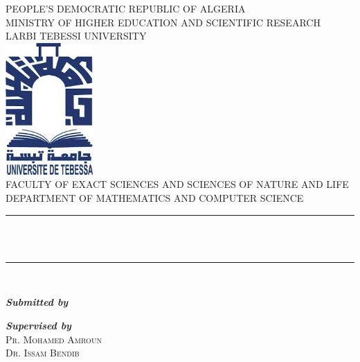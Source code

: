 \begin{titlepage}
	\begin{center}
		PEOPLE’S DEMOCRATIC REPUBLIC OF ALGERIA\\[0.4cm]
		MINISTRY OF HIGHER EDUCATION AND SCIENTIFIC RESEARCH\\[0.4cm]
		LARBI TEBESSI UNIVERSITY\\[0.4cm]
		\includegraphics[width=0.25\textwidth]{./images/univ-tebessa.jpg}\\[1cm]
		FACULTY OF EXACT SCIENCES AND SCIENCES OF NATURE AND LIFE\\[0.4cm]
		DEPARTMENT OF MATHEMATICS AND COMPUTER SCIENCE\\[0.5cm]
		\rule{\textwidth}{0.075cm}\\[0.4cm]
		\textsc{\huge \bfseries \@title}\\[1cm] 
		\rule{\textwidth}{0.075cm}\\[1cm]
		\begin{minipage}{0.4\textwidth}
			\begin{flushleft}
				\emph{\textbf{Submitted by}}\\
				\textsc{\@author}
			\end{flushleft}
		\end{minipage}
		\begin{minipage}{0.4\textwidth}
			\begin{flushright}
				\emph{\textbf{Supervised by}}\\
				\textsc{Pr. Mohamed Amroun}\\
				\textsc{Dr. Issam Bendib}
			\end{flushright}
		\end{minipage}
		\vfill
		\@date
	\end{center}
\end{titlepage}
